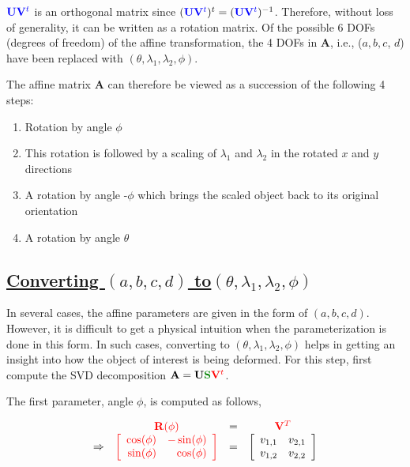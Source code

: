 ${\color{blue}\mathbf{U}\mathbf{V}^t}$ is an orthogonal matrix since $({\color{blue}\mathbf{U}\mathbf{V}^t})^t =({\color{blue}\mathbf{U}\mathbf{V}^t})^{-1}$.  Therefore, without loss of generality, it can be written as a rotation matrix.  Of the possible 6 DOFs (degrees of freedom) of the affine transformation, the 4 DOFs in $\mathbf{A}$, i.e., ($a, b, c$, $d$) have been replaced with $(\theta, \lambda_1, \lambda_2, \phi)$.

The affine matrix $\mathbf{A}$ can therefore be viewed as a succession of the following 4 steps:

\begin{enumerate} 
\item Rotation by angle $\phi$ 
\item This rotation is followed by a scaling of $\lambda_1$ and $\lambda_2$ in the rotated $x$ and $y$ directions
\item A rotation by angle -$\phi$ which brings the scaled object back to its original orientation
\item A rotation by angle $\theta$
\end{enumerate}

\subsection{\underline{Converting $(a, b, c, d)$ to$(\theta, \lambda_1, \lambda_2, \phi)$}}
In several cases, the affine parameters are given in the form of $(a, b, c, d)$.  However, it is difficult to get a physical intuition when the parameterization is done in this form.  In such cases, converting to $(\theta, \lambda_1, \lambda_2, \phi)$ helps in getting an insight into how the object of interest is being deformed.  For this step, first compute the SVD decomposition $\mathbf{A}=\mathbf{U}{\color{darkgreen}\mathbf{S}}{\color{red}\mathbf{V}^t}$.  

The first parameter, angle $\phi$, is computed as follows,

\begin{equation}
\begin{array}{ccccll}
&{\color{red}\mathbf{R}(\phi)}&=&{\color{red}\mathbf{V}^T}\\
\Rightarrow &{\color{red}\left[ \begin{array}{rr} \cos(\phi) & -\sin(\phi) \\ \sin(\phi) & \cos(\phi) \\ \end{array} \right]} &=& \left[\begin{array}{llll}v_{1,1} &v_{2,1}\\v_{1,2} & v_{2,2}\end{array}\right]\\
\end{array}
\end{equation}

